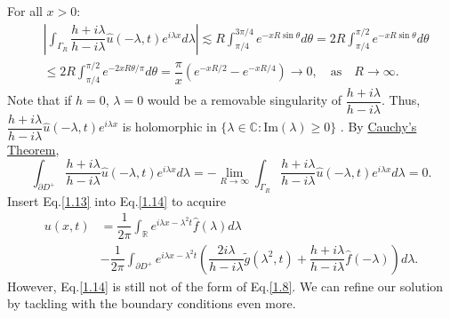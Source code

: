 \documentclass[12pt]{article}
\numberwithin{equation}{section}
\begin{document}
For all $x>0$:
\begin{align*}
    &\left| \int_{\Gamma_R} \dfrac{h+i\lambda}{h-i\lambda}\hat{u}(-\lambda,t)e^{i\lambda x}d\lambda\right|\lesssim R\int_{\pi/4}^{3\pi/4} e^{-xR\sin\theta} d\theta=2R\int_{\pi/4}^{\pi/2}e^{-xR\sin\theta}d\theta\\
    &\leqslant 2R\int_{\pi/4}^{\pi/2} e^{-{2xR\theta}/{\pi}} d\theta=\dfrac{\pi}{x}\left(e^{-{xR}/{2}}-e^{-{xR}/{4}}\right)\longrightarrow 0, \quad \text{as}\quad  R \to\infty.
\end{align*}
Note that if $h=0$, $\lambda=0$ would be a removable singularity of $\dfrac{h+i\lambda}{h-i\lambda}$. Thus, $\dfrac{h+i\lambda}{h-i\lambda}\hat{u}(-\lambda,t)e^{i\lambda x}$ is holomorphic in $\{\lambda\in\mathbb{C}: \text{Im}(\lambda)\geqslant 0\}$ . By \href{https://w.wiki/9aTM}{Cauchy's Theorem},
\begin{equation}\label{1.13}
    \int_{\partial D^+}\dfrac{h+i\lambda}{h-i\lambda}\hat{u}(-\lambda,t)e^{i\lambda x}d\lambda=-\lim\limits_{R\to\infty} \int_{\Gamma_R} \dfrac{h+i\lambda}{h-i\lambda}\hat{u}(-\lambda,t)e^{i\lambda x}d\lambda=0.
\end{equation}
Insert Eq.\eqref{1.13} into Eq.\eqref{1.14} to acquire
\begin{equation}\label{1.14}
    \begin{split}
        u(x,t)&=\dfrac{1}{2\pi}\int_{\mathbb{R}}e^{i\lambda x-\lambda^2 t}\hat{f}(\lambda)d\lambda\\
        &-\dfrac{1}{2\pi} \int_{\partial D^+} e^{i\lambda x-\lambda^2 t}\left(\dfrac{2i\lambda}{h-i\lambda}\tilde{g}(\lambda^2,t)+\dfrac{h+i\lambda}{h-i\lambda}\hat{f}(-\lambda)\right) d\lambda.
    \end{split}
\end{equation}
However, Eq.\eqref{1.14} is still not of the form of Eq.\eqref{1.8}. We can refine our solution by tackling with the boundary conditions even more.
\end{document}
